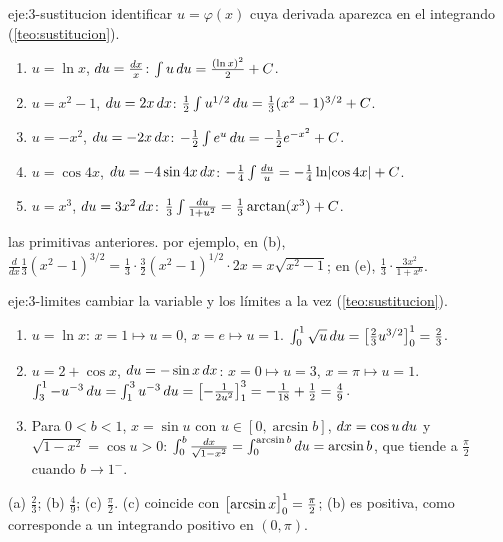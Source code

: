 \begin{solucion}{eje:3-sustitucion}
\planteamiento identificar $u=\varphi(x)$ cuya derivada aparezca en el integrando (\cref{teo:sustitucion}).
\pasos
\begin{enumerate}[label=(\alph*)]
  \item $u=\ln x$, $\mathop{}\!d u=\frac{\mathop{}\!d x}{x}$: $\int u\mathop{}\!d u=\frac{(\ln x)^{2}}{2}+C$.
  \item $u=x^{2}-1$, $\mathop{}\!d u=2x\mathop{}\!d x$: $\frac12\int u^{1/2}\mathop{}\!d u=\frac13(x^{2}-1)^{3/2}+C$.
  \item $u=-x^{2}$, $\mathop{}\!d u=-2x\mathop{}\!d x$: $-\frac12\int e^{u}\mathop{}\!d u=-\frac12e^{-x^{2}}+C$.
  \item $u=\cos4x$, $\mathop{}\!d u=-4\sin4x\mathop{}\!d x$: $-\frac14\int\frac{\mathop{}\!d u}{u}=-\frac14\ln\lvert\cos4x\rvert+C$.
  \item $u=x^{3}$, $\mathop{}\!d u=3x^{2}\mathop{}\!d x$: $\frac13\int\frac{\mathop{}\!d u}{1+u^{2}}=\frac13\arctan(x^{3})+C$.
\end{enumerate}
\resultado las primitivas anteriores.
\comprobacion por ejemplo, en (b), $\frac{d}{dx}\frac13(x^{2}-1)^{3/2}=\frac13\cdot\frac32(x^{2}-1)^{1/2}\cdot2x=x\sqrt{x^{2}-1}$; en (e), $\frac13\cdot\frac{3x^{2}}{1+x^{6}}$.
\end{solucion}

\begin{solucion}{eje:3-limites}
\planteamiento cambiar la variable y los límites a la vez (\cref{teo:sustitucion}).
\pasos
\begin{enumerate}[label=(\alph*)]
  \item $u=\ln x$: $x=1\mapsto u=0$, $x=e\mapsto u=1$. $\int_0^{1}\sqrt u\mathop{}\!d u=\bigl[\frac23u^{3/2}\bigr]_{0}^{1}=\frac23$.
  \item $u=2+\cos x$, $\mathop{}\!d u=-\sin x\mathop{}\!d x$: $x=0\mapsto u=3$, $x=\pi\mapsto u=1$. $\int_3^{1}-u^{-3}\mathop{}\!d u=\int_1^{3}u^{-3}\mathop{}\!d u=\bigl[-\frac{1}{2u^{2}}\bigr]_{1}^{3}=-\frac{1}{18}+\frac12=\frac49$.
  \item Para $0<b<1$, $x=\sin u$ con $u\in[0,\arcsin b]$, $\mathop{}\!d x=\cos u\mathop{}\!d u$ y $\sqrt{1-x^{2}}=\cos u>0$: $\int_0^{b}\frac{\mathop{}\!d x}{\sqrt{1-x^{2}}}=\int_0^{\arcsin b}\mathop{}\!d u=\arcsin b$, que tiende a $\frac\pi2$ cuando $b\to1^{-}$.
\end{enumerate}
\resultado (a) $\frac23$; (b) $\frac49$; (c) $\frac\pi2$.
\comprobacion (c) coincide con $\bigl[\arcsin x\bigr]_{0}^{1}=\frac\pi2$; (b) es positiva, como corresponde a un integrando positivo en $(0,\pi)$.
\end{solucion}

